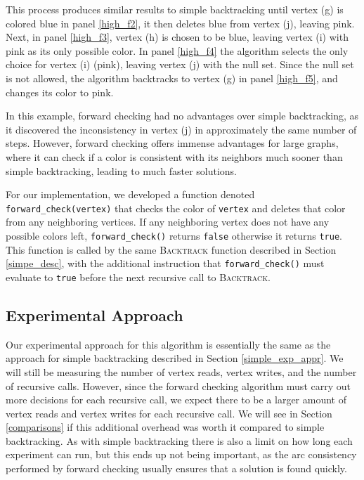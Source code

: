 \documentclass{article}
\begin{document}
		This process produces similar results to simple backtracking until vertex (g) is colored blue in panel \ref{high_f2}, it then deletes blue from vertex (j), leaving pink. Next, in panel \ref{high_f3}, vertex (h) is chosen to be blue, leaving vertex (i) with pink as its only possible color. In panel \ref{high_f4} the algorithm selects the only choice for vertex (i) (pink), leaving vertex (j) with the null set. Since the null set is not allowed, the algorithm backtracks to vertex (g) in panel \ref{high_f5}, and changes its color to pink.
		
		In this example, forward checking had no advantages over simple backtracking, as it discovered the inconsistency in vertex (j) in approximately the same number of steps. However, forward checking offers immense advantages for large graphs, where it can check if a color is consistent with its neighbors much sooner than simple backtracking, leading to much faster solutions.
		
		For our implementation, we developed a function denoted \texttt{forward\_check(vertex)} that checks the color of \texttt{vertex} and deletes that color from any neighboring vertices. If any neighboring vertex does not have any possible colors left, \texttt{forward\_check()} returns \texttt{false} otherwise it returns \texttt{true}. This function is called by the same \textsc{Backtrack} function described in Section \ref{simpe_desc}, with the additional instruction that \texttt{forward\_check()} must evaluate to \texttt{true} before the next recursive call to \textsc{Backtrack}.
		

	\subsection{Experimental Approach}
	
		Our experimental approach for this algorithm is essentially the same as the approach for simple backtracking described in Section \ref{simple_exp_appr}. We will still be measuring the number of vertex reads, vertex writes, and the number of recursive calls. However, since the forward checking algorithm must carry out more decisions for each recursive call, we expect there to be a larger amount of vertex reads and vertex writes for each recursive call. We will see in Section \ref{comparisons} if this additional overhead was worth it compared to simple backtracking. As with simple backtracking there is also a limit on how long each experiment can run, but this ends up not being important, as the arc consistency performed by forward checking usually ensures that a solution is found quickly.
	
\end{document}

